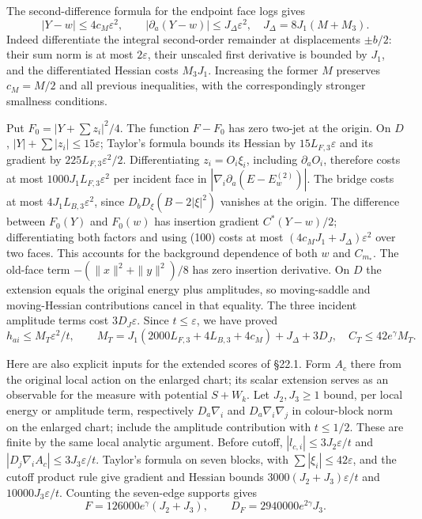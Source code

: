 \documentclass[11pt,a4paper]{article}
\begin{document}
The second-difference formula for the endpoint face logs gives
\[|Y-w|\le4c_M\varepsilon^2,\qquad
|\partial_a(Y-w)|\le J_\Delta\varepsilon^2,
\quad J_\Delta=8J_1(M+M_3).\tag{100}\] Indeed differentiate the integral
second-order remainder at displacements \(\pm b/2\): their sum norm is
at most \(2\varepsilon\), their unscaled first derivative is bounded by
\(J_1\), and the differentiated Hessian costs \(M_3J_1\). Increasing the
former \(M\) preserves \(c_M=M/2\) and all previous inequalities, with
the correspondingly stronger smallness conditions.

Put \(F_0=|Y+\sum z_i|^2/4\). The function \(F-F_0\) has zero two-jet at
the origin. On \(D\), \(|Y|+\sum|z_i|\le15\varepsilon\); Taylor's
formula bounds its Hessian by \(15L_{F,3}\varepsilon\) and its gradient
by \(225L_{F,3}\varepsilon^2/2\). Differentiating \(z_i=O_i\xi_i\),
including \(\partial_aO_i\), therefore costs at most
\(1000J_1L_{F,3}\varepsilon^2\) per incident face in
\(|\nabla_i\partial_a(E-E_w^{(2)})|\). The bridge costs at most
\(4J_1L_{B,3}\varepsilon^2\), since \(D_bD_\xi(B-2|\xi|^2)\) vanishes at
the origin. The difference between \(F_0(Y)\) and \(F_0(w)\) has
insertion gradient \(C^*(Y-w)/2\); differentiating both factors and
using (100) costs at most \((4c_MJ_1+J_\Delta)\varepsilon^2\) over two
faces. This accounts for the background dependence of both \(w\) and
\(C_{m_*}\). The old-face term \(-(\|x\|^2+\|y\|^2)/8\) has zero
insertion derivative. On \(D\) the extension equals the original energy
plus amplitudes, so moving-saddle and moving-Hessian contributions
cancel in that equality. The three incident amplitude terms cost
\(3D_J\varepsilon\). Since \(t\le\varepsilon\), we have proved
\[h_{ai}\le M_T\varepsilon^2/t,\qquad
M_T=J_1(2000L_{F,3}+4L_{B,3}+4c_M)+J_\Delta+3D_J,
\quad C_T\le42e^\gamma M_T.\tag{101}\]

Here are also explicit inputs for the extended scores of §22.1. Form
\(A_c\) there from the original local action on the enlarged chart; its
scalar extension serves as an observable for the measure with potential
\(S+W_k\). Let \(J_2,J_3\ge1\) bound, per local energy or amplitude
term, respectively \(D_a\nabla_i\) and \(D_a\nabla_i\nabla_j\) in
colour-block norm on the enlarged chart; include the amplitude
contribution with \(t\le1/2\). These are finite by the same local
analytic argument. Before cutoff, \(|l_{c,i}|\le3J_2\varepsilon/t\) and
\(|D_j\nabla_i A_c|\le3J_3\varepsilon/t\). Taylor's formula on seven
blocks, with \(\sum|\xi_i|\le42\varepsilon\), and the cutoff product
rule give gradient and Hessian bounds \(3000(J_2+J_3)\varepsilon/t\) and
\(10000J_3\varepsilon/t\). Counting the seven-edge supports gives
\[F=126000e^\gamma(J_2+J_3),\qquad
D_F=2940000e^{2\gamma}J_3.\tag{102}\]
\end{document}
